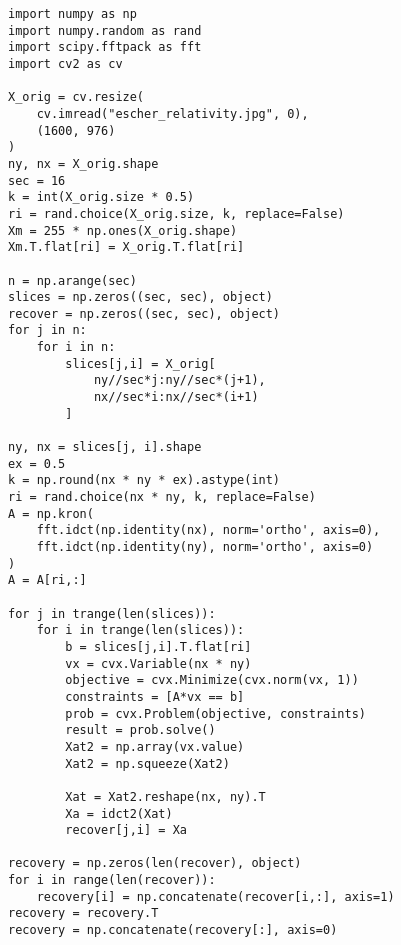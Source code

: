 \clearpage

\begin{lstlisting}
import numpy as np
import numpy.random as rand
import scipy.fftpack as fft
import cv2 as cv

X_orig = cv.resize(
	cv.imread("escher_relativity.jpg", 0),
	(1600, 976)
)
ny, nx = X_orig.shape
sec = 16
k = int(X_orig.size * 0.5)
ri = rand.choice(X_orig.size, k, replace=False)
Xm = 255 * np.ones(X_orig.shape)
Xm.T.flat[ri] = X_orig.T.flat[ri]

n = np.arange(sec)
slices = np.zeros((sec, sec), object)
recover = np.zeros((sec, sec), object)
for j in n:
	for i in n:
		slices[j,i] = X_orig[
			ny//sec*j:ny//sec*(j+1),
			nx//sec*i:nx//sec*(i+1)
		]
		
ny, nx = slices[j, i].shape
ex = 0.5
k = np.round(nx * ny * ex).astype(int)
ri = rand.choice(nx * ny, k, replace=False)
A = np.kron(
	fft.idct(np.identity(nx), norm='ortho', axis=0),
	fft.idct(np.identity(ny), norm='ortho', axis=0)
)
A = A[ri,:]

for j in trange(len(slices)):
	for i in trange(len(slices)):
		b = slices[j,i].T.flat[ri]
		vx = cvx.Variable(nx * ny)
		objective = cvx.Minimize(cvx.norm(vx, 1))
		constraints = [A*vx == b]
		prob = cvx.Problem(objective, constraints)
		result = prob.solve()
		Xat2 = np.array(vx.value)
		Xat2 = np.squeeze(Xat2)
		
		Xat = Xat2.reshape(nx, ny).T
		Xa = idct2(Xat)
		recover[j,i] = Xa
		
recovery = np.zeros(len(recover), object)
for i in range(len(recover)):
	recovery[i] = np.concatenate(recover[i,:], axis=1)
recovery = recovery.T
recovery = np.concatenate(recovery[:], axis=0)
\end{lstlisting}


